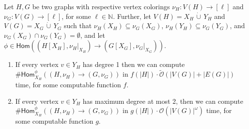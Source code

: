\documentclass[authorcolumns,numberwithinsect]{no-lipics-v2022}
\newcommand{\homs}[2]{\mathsf{Hom}(#1 \to #2)}
\newcommand{\parthomsX}[3]{\mathsf{Hom}^{\phi}_{#3}(#1 \to #2)}
\begin{document}
\begin{lemma}\label{lem:partialHomsFPT}
Let $H, G$ be two graphs with respective vertex colorings $\nu_H: V(H) \to [\ell]$ and $\nu_G : V(G) \to [\ell]$, for some $\ell \in \mathbb{N}$. Further, let $V(H) = X_H \,\dot\cup\, Y_H$ and $V(G) = X_G \,\dot\cup\, Y_G$ such that $\nu_H(X_H) \subseteq \nu_G(X_G)$, $\nu_H(Y_H) \subseteq \nu_G(Y_G)$, and $\nu_G(X_G)\cap\nu_G(Y_G) = \emptyset$, and let $\phi \in \homs{(H[X_H], \nu_H|_{X_H})}{(G[X_G], \nu_G|_{X_G})}$.
\begin{enumerate}
    \item If every vertex $v \in Y_H$ has degree 1 then we can compute $\#\parthomsX{(H, \nu_H)}{(G, \nu_G)}{X_H}$ in $f(|H|)\cdot\tilde{\mathcal{O}}(|V(G)| + |E(G)|)$ time, for some computable function $f$.
    \item If every vertex $v \in Y_H$ has maximum degree at most 2, then we can compute $\#\parthomsX{(H, \nu_H)}{(G, \nu_G)}{X_H}$ in $g(|H|)\cdot\mathcal{O}(|V(G)|^{\omega})$ time, for some computable function $g$.
\end{enumerate}
\end{lemma}
\end{document}
